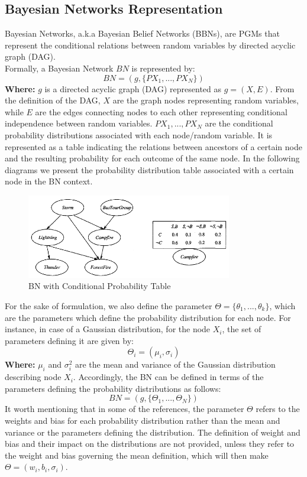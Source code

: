 \documentclass{article}
\begin{document}
\subsection{Bayesian Networks Representation}
Bayesian Networks, a.k.a Bayesian Belief Networks (BBNs), are PGMs that represent the conditional relations between random variables by directed acyclic graph (DAG). \\
Formally, a Bayesian Network $BN$ is represented by:
\begin{equation}
BN = (g, \{ P{X_1},..., P{X_N}  \})
\end{equation}
\textbf{Where:} $g$ is a directed acyclic graph (DAG) represented as $g=(X,E)$. From the definition of the DAG, $X$ are the graph nodes representing random variables, while $E$ are the edges connecting nodes to each other representing conditional independence between random variables. $P{X_1},..., P{X_N}$ are the conditional probability distributions associated with each node/random variable. It is represented as a table indicating the relations between ancestors of a certain node and the resulting probability for each outcome of the same node. In the following diagrams we present the probability distribution table associated with a certain node in the BN context.

\begin{figure}[H]
	\centering
	\includegraphics[width=0.8\textwidth]{cond_prob.png}
	\caption{BN with Conditional Probability Table}
\end{figure}
For the sake of formulation, we also define the parameter $\Theta = \{\theta_1, ..., \theta_k\}$, which are the parameters which define the probability distribution for each node. For instance, in case of a Gaussian distribution, for the node $X_i$, the set of parameters defining it are given by: 
\begin{equation}
\Theta_i = (\mu_i, \sigma_i)
\end{equation}
\textbf{Where:} $\mu_i$ and $\sigma_i^2$ are the mean and variance of the Gaussian distribution describing node $X_i$. Accordingly, the BN can be defined in terms of the parameters defining the probability distributions as follows:
\begin{equation}
BN = (g, \{ \Theta_1,..., \Theta_N  \})
\end{equation}
It worth mentioning that in some of the references, the parameter $\Theta$ refers to the weights and bias for each probability distribution rather than the mean and variance or the parameters defining the distribution. The definition of weight and bias and their impact on the distributions are not provided, unless they refer to the weight and bias governing the mean definition, which will then make $\Theta=(w_i, b_i, \sigma_i)$. 
\end{document}
